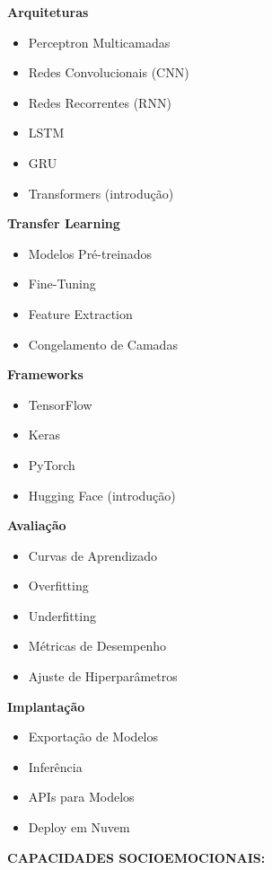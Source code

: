 \textbf{Arquiteturas}

\begin{itemize}
\item Perceptron Multicamadas
\item Redes Convolucionais (CNN)
\item Redes Recorrentes (RNN)
\item LSTM
\item GRU
\item Transformers (introdução)
\end{itemize}

\textbf{Transfer Learning}

\begin{itemize}
\item Modelos Pré-treinados
\item Fine-Tuning
\item Feature Extraction
\item Congelamento de Camadas
\end{itemize}

\textbf{Frameworks}

\begin{itemize}
\item TensorFlow
\item Keras
\item PyTorch
\item Hugging Face (introdução)
\end{itemize}

\textbf{Avaliação}

\begin{itemize}
\item Curvas de Aprendizado
\item Overfitting
\item Underfitting
\item Métricas de Desempenho
\item Ajuste de Hiperparâmetros
\end{itemize}

\textbf{Implantação}

\begin{itemize}
\item Exportação de Modelos
\item Inferência
\item APIs para Modelos
\item Deploy em Nuvem
\end{itemize}

\textbf{CAPACIDADES SOCIOEMOCIONAIS:}

